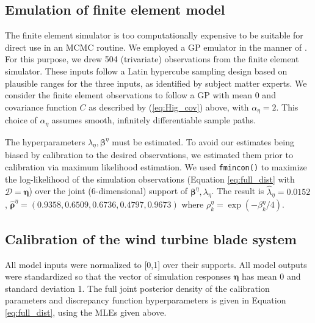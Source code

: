 \documentclass[12pt]{article}
\begin{document}
\subsection{Emulation of finite element model}\label{emulator}
The finite element simulator is too computationally expensive to be suitable for direct use in an MCMC routine. 
%
We employed a GP emulator in the manner of \cite{Williams2006}. 
%
For this purpose, we drew 504 (trivariate) observations from the finite element simulator. 
%
These inputs follow a Latin hypercube sampling design \citep{McKay1979} based on plausible ranges for the three inputs, as identified by subject matter experts.
%
We consider the finite element observations to follow a GP with mean 0 and covariance function $C$ as described by (\ref{eq:Hig_cov}) above, with $\alpha_\eta=2$. 
%
This choice of $\alpha_\eta$ assumes smooth, infinitely differentiable sample paths. 
%

The hyperparameters $\lambda_\eta,\boldsymbol \beta^\eta$ must be estimated.
% 
To avoid our estimates being biased by calibration to the desired observations, we estimated them prior to calibration via maximum likelihood estimation.
% 
%
We used \texttt{fmincon()} \citep{MATLAB2017} %
to maximize the log-likelihood of the simulation observations  (Equation \eqref{eq:full_dist} with $\mathcal D=\boldsymbol\eta$) over the joint (6-dimensional) support of $\boldsymbol \beta^\eta,\lambda_\eta$.  
%
The result is $\hat\lambda_\eta = 0.0152$, $\boldsymbol {\hat\rho}^\eta = (0.9358, 0.6509, 0.6736, 0.4797, 0.9673)$
where $\rho^\eta_k = \exp(-\beta_k^\eta/4)$. 

\subsection{Calibration of the wind turbine blade system}\label{the_model}
%
All model inputs were normalized to [0,1] over their supports. 
%
All model outputs were standardized so that the vector of simulation responses $\boldsymbol\eta$ has mean 0 and standard deviation 1.
%
The full joint posterior density of the calibration parameters and discrepancy function hyperparameters is given in Equation \eqref{eq:full_dist}, using the MLEs given above.
%
\end{document}
